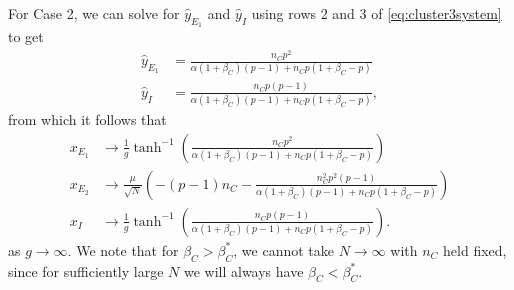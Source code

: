 \documentclass[reqno]{siamonline190516}
\begin{document}
For Case 2, we can solve for $\hat{y}_{E_1}$ and $\hat{y}_I$ using rows 2 and 3 of \cref{eq:cluster3system} to get
\begin{equation}\label{eq:ye1hatyihat}
    \begin{aligned}
        \hat{y}_{E_1} &= \frac{n_C p^2 }{ \alpha(1+\beta_C)(p-1) + n_C p(1 + \beta_C - p)} \\
        \hat{y}_{I} &= \frac{n_C p(p-1) }{ \alpha(1+\beta_C)(p-1) + n_C p(1 + \beta_C - p)},
    \end{aligned}
\end{equation}
from which it follows that
\begin{equation}
    \begin{aligned}
        x_{E_1} &\rightarrow \frac{1}{g} \tanh^{-1} \left( \frac{n_C p^2 }{ \alpha(1+\beta_C)(p-1) + n_C p(1 + \beta_C - p)}  \right) \\
        x_{E_2} &\rightarrow \frac{\mu}{\sqrt{N}}\left( -(p-1)n_C - \frac{n_C^2 p^2(p-1) }{ \alpha(1+\beta_C)(p-1) + n_C p(1 + \beta_C - p)}\right) \\
        x_{I} &\rightarrow \frac{1}{g} \tanh^{-1} \left(\frac{n_C p(p-1) }{ \alpha(1+\beta_C)(p-1) + n_C p(1 + \beta_C - p)} \right).
    \end{aligned}
\end{equation}
as $g \rightarrow \infty$. We note that for $\beta_C > \beta_C^*$, we cannot take $N \rightarrow \infty$ with $n_C$ held fixed, since for sufficiently large $N$ we will always have $\beta_C < \beta_C^*$. 
\end{document}
